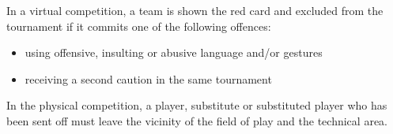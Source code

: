 \bigskip

In a virtual competition, a team is shown the red card and excluded from the tournament if it commits one of the following offences:

\begin{itemize}
\item using offensive, insulting or abusive language and/or gestures
\item receiving a second caution in the same tournament
\end{itemize}

\bigskip

In the physical competition, a player, substitute or substituted player who has been sent off must leave the vicinity of the field of play and the technical area.
